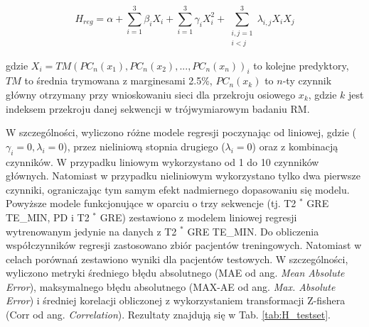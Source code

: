 \begin{equation}
H_{reg} = \alpha + \sum_{i=1}^{3}\beta_{i}X_{i} + \sum_{i=1}^{3}\gamma_{i}X_{i}^{2} +
\sum_{\substack{i, j = 1\\ i < j}}^{3}\lambda_{i,j}X_{i}X_{j}
\end{equation}

gdzie $X_i = TM(PC_n(x_1), PC_n(x_2),..., PC_n(x_n))_{i}$ to kolejne predyktory, $TM$ to średnia trymowana z marginesami 2.5\%, $PC_n(x_k)$ to $n$-ty czynnik główny otrzymany przy wnioskowaniu sieci dla przekroju osiowego $x_k$, gdzie $k$ jest indeksem przekroju danej sekwencji w trójwymiarowym badaniu RM.

W szczególności, wyliczono różne modele regresji poczynając od liniowej, gdzie ($\gamma_{i}=0, \lambda_{i}=0$), przez nieliniową stopnia drugiego ($\lambda_{i}=0$) oraz z kombinacją czynników. W przypadku liniowym wykorzystano od 1 do 10 czynników głównych. Natomiast w przypadku nieliniowym wykorzystano tylko dwa pierwsze czynniki, ograniczając tym samym efekt nadmiernego dopasowaniu się modelu. Powyższe modele funkcjonujące w oparciu o trzy sekwencje (tj. T2 $^\ast$ GRE TE\_MIN, PD i T2 $^\ast$ GRE) zestawiono z modelem liniowej regresji wytrenowanym jedynie na danych z T2 $^\ast$ GRE TE\_MIN. Do obliczenia współczynników regresji zastosowano zbiór pacjentów treningowych. Natomiast w celach porównań zestawiono wyniki dla pacjentów testowych. W szczególności, wyliczono metryki średniego błędu absolutnego (MAE od ang. \textit{Mean Absolute Error}), maksymalnego błędu absolutnego (MAX-AE od ang. \textit{Max. Absolute Error}) i średniej korelacji obliczonej z wykorzystaniem transformacji Z-fishera (Corr od ang. \textit{Correlation}). Rezultaty znajdują się w Tab. \ref{tab:H_testset}.
\renewcommand{\arraystretch}{1.2}
